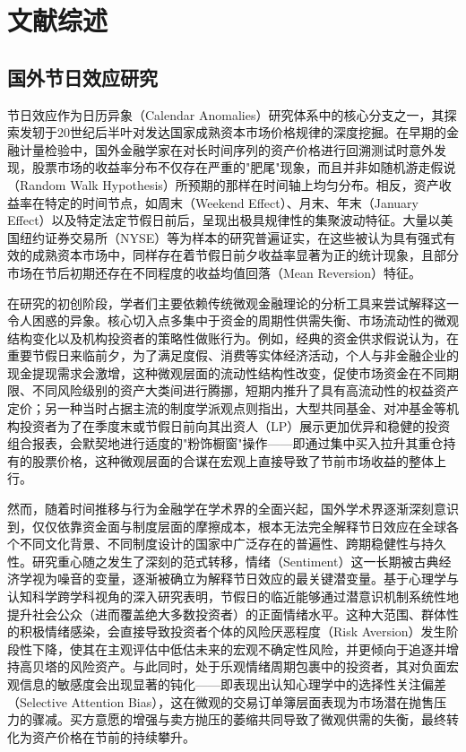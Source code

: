 \documentclass{cupb-thesis}
\begin{document}
\chapter*{文献综述}


\section{国外节日效应研究}


节日效应作为日历异象（Calendar Anomalies）研究体系中的核心分支之一，其探索发轫于20世纪后半叶对发达国家成熟资本市场价格规律的深度挖掘。在早期的金融计量检验中，国外金融学家在对长时间序列的资产价格进行回溯测试时意外发现，股票市场的收益率分布不仅存在严重的"肥尾"现象，而且并非如随机游走假说（Random Walk Hypothesis）所预期的那样在时间轴上均匀分布。相反，资产收益率在特定的时间节点，如周末（Weekend Effect）、月末、年末（January Effect）以及特定法定节假日前后，呈现出极具规律性的集聚波动特征。大量以美国纽约证券交易所（NYSE）等为样本的研究普遍证实，在这些被认为具有强式有效的成熟资本市场中，同样存在着节假日前夕收益率显著为正的统计现象，且部分市场在节后初期还存在不同程度的收益均值回落（Mean Reversion）特征。


在研究的初创阶段，学者们主要依赖传统微观金融理论的分析工具来尝试解释这一令人困惑的异象。核心切入点多集中于资金的周期性供需失衡、市场流动性的微观结构变化以及机构投资者的策略性做账行为。例如，经典的资金供求假说认为，在重要节假日来临前夕，为了满足度假、消费等实体经济活动，个人与非金融企业的现金提现需求会激增，这种微观层面的流动性结构性改变，促使市场资金在不同期限、不同风险级别的资产大类间进行腾挪，短期内推升了具有高流动性的权益资产定价；另一种当时占据主流的制度学派观点则指出，大型共同基金、对冲基金等机构投资者为了在季度末或节假日前向其出资人（LP）展示更加优异和稳健的投资组合报表，会默契地进行适度的"粉饰橱窗"操作——即通过集中买入拉升其重仓持有的股票价格，这种微观层面的合谋在宏观上直接导致了节前市场收益的整体上行。


然而，随着时间推移与行为金融学在学术界的全面兴起，国外学术界逐渐深刻意识到，仅仅依靠资金面与制度层面的摩擦成本，根本无法完全解释节日效应在全球各个不同文化背景、不同制度设计的国家中广泛存在的普遍性、跨期稳健性与持久性。研究重心随之发生了深刻的范式转移，情绪（Sentiment）这一长期被古典经济学视为噪音的变量，逐渐被确立为解释节日效应的最关键潜变量。基于心理学与认知科学跨学科视角的深入研究表明，节假日的临近能够通过潜意识机制系统性地提升社会公众（进而覆盖绝大多数投资者）的正面情绪水平。这种大范围、群体性的积极情绪感染，会直接导致投资者个体的风险厌恶程度（Risk Aversion）发生阶段性下降，使其在主观评估中低估未来的宏观不确定性风险，并更倾向于追逐并增持高贝塔的风险资产。与此同时，处于乐观情绪周期包裹中的投资者，其对负面宏观信息的敏感度会出现显著的钝化——即表现出认知心理学中的选择性关注偏差（Selective Attention Bias），这在微观的交易订单簿层面表现为市场潜在抛售压力的骤减。买方意愿的增强与卖方抛压的萎缩共同导致了微观供需的失衡，最终转化为资产价格在节前的持续攀升。
\end{document}
